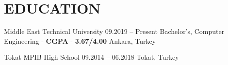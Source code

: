 \section{EDUCATION}

\resumeSubHeadingListStart
  
\resumeSubheading
  {Middle East Technical University}
  {09.2019 -- Present}
  {Bachelor's, Computer Engineering - \textbf{CGPA} - \textbf{3.67/4.00}}
  {Ankara, Turkey}
    \resumeItemListStart
    \resumeItemListEnd
\resumeSubHeadingListEnd

\resumeSubHeadingListStart
  \resumeSubheading
    {Tokat MPIB High School}
    {09.2014 -- 06.2018}
    {}
    {Tokat, Turkey}
\resumeSubHeadingListEnd
